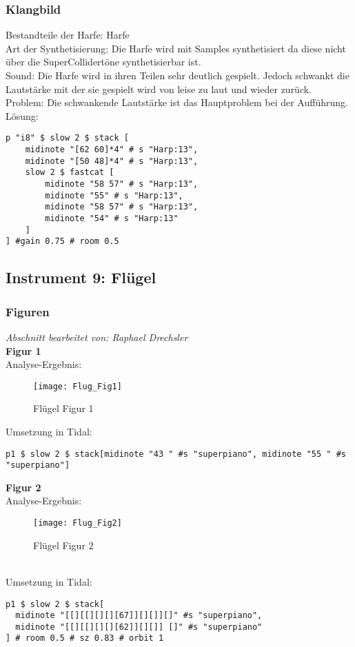 \documentclass[
10pt, %
a4paper, %
oneside, %
headinclude,footinclude, %
BCOR5mm, %
]{scrartcl}
\begin{document}
\subsubsection{Klangbild}
Bestandteile der Harfe: Harfe\\
Art der Synthetisierung: Die Harfe wird mit Samples synthetisiert da diese nicht über die SuperCollidertöne synthetisierbar ist.\\
Sound: Die Harfe wird in ihren Teilen sehr deutlich gespielt. Jedoch schwankt die Lautstärke mit der sie gespielt wird von leise zu laut und wieder zurück.\\
Problem: Die schwankende Lautstärke ist das Hauptproblem bei der Aufführung.\\
Lösung:\\
\begin{lstlisting}
p "i8" $ slow 2 $ stack [
	midinote "[62 60]*4" # s "Harp:13",
	midinote "[50 48]*4" # s "Harp:13",
	slow 2 $ fastcat [
		midinote "58 57" # s "Harp:13",
		midinote "55" # s "Harp:13",
		midinote "58 57" # s "Harp:13",
		midinote "54" # s "Harp:13"
	]
] #gain 0.75 # room 0.5
\end{lstlisting}


\subsection{Instrument 9: Flügel}
\subsubsection{Figuren}
\textit{Abschnitt bearbeitet von: Raphael Drechsler}\\

\noindent\textbf{Figur 1}\\
Analyse-Ergebnis:
\begin{figure}[h]
	\centering 
	\texttt{[image: Flug\_Fig1]} 
	\caption{Flügel Figur 1}
\end{figure}
\noindent Umsetzung in Tidal:
\begin{lstlisting}
p1 $ slow 2 $ stack[midinote "43 " #s "superpiano", midinote "55 " #s "superpiano"]
\end{lstlisting}

\noindent \textbf{Figur 2}\\
Analyse-Ergebnis:
\begin{figure}[h]
	\centering 
	\texttt{[image: Flug\_Fig2]} 
	\caption{Flügel Figur 2}
\end{figure}\\
\noindent Umsetzung in Tidal:
\begin{lstlisting}
p1 $ slow 2 $ stack[
  midinote "[[][[][][][67]][][]][]" #s "superpiano",
  midinote "[[][[][][][62]][][]] []" #s "superpiano"
] # room 0.5 # sz 0.83 # orbit 1
\end{lstlisting}
\end{document}
